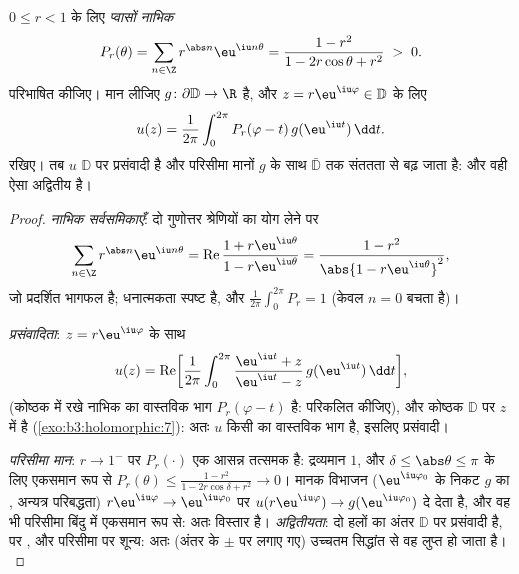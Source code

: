 \begin{theorem}[प्वासों सूत्र; चक्र पर दिरिक्ले
समस्या]\label{thm:b3:conformal:poisson}
$0 \leq r < 1$ के लिए \emph{प्वासों नाभिक}
\[
P_r(\theta) = \sum_{n\in\Z}r^{\abs n}\eu^{\iu n\theta}
= \frac{1 - r^2}{1 - 2r\cos\theta + r^2} \;>\; 0 .
\]
परिभाषित कीजिए। मान लीजिए $g \colon \partial\mathbb D \to \R$  है, और $z = r\eu^{\iu\varphi} \in \mathbb D$ के लिए
\[
u(z) = \frac1{2\pi}\int_0^{2\pi}
P_r(\varphi - t)\,g(\eu^{\iu t})\,\dd t .
\]
रखिए। तब $u$ $\mathbb D$ पर प्रसंवादी है और परिसीमा मानों $g$ के
साथ $\bar{\mathbb D}$ तक संततता से बढ़ जाता है: और वही ऐसा अद्वितीय  है।
\end{theorem}

\begin{proof}
\emph{नाभिक सर्वसमिकाएँ}: दो गुणोत्तर श्रेणियों का योग लेने पर
\[
\sum_{n\in\Z}r^{\abs n}\eu^{\iu n\theta}
= \operatorname{Re}\frac{1 + r\eu^{\iu\theta}}{1 -
r\eu^{\iu\theta}}
= \frac{1 - r^2}{\abs{1 - r\eu^{\iu\theta}}^2},
\]
जो प्रदर्शित भागफल है; धनात्मकता स्पष्ट है, और $\frac1{2\pi}\int_0^{2\pi}P_r = 1$ (केवल $n = 0$
बचता है)।

\emph{प्रसंवादिता}: $z = r\eu^{\iu\varphi}$ के साथ
\[
u(z) = \operatorname{Re}\biggl[\frac1{2\pi}\int_0^{2\pi}
\frac{\eu^{\iu t} + z}{\eu^{\iu t} - z}\,
g(\eu^{\iu t})\,\dd t\biggr],
\]
(कोष्ठक में रखे नाभिक का वास्तविक भाग $P_r(\varphi - t)$ है: परिकलित कीजिए),
और कोष्ठक $\mathbb D$ पर $z$ में  है (\cref{exo:b3:holomorphic:7}): अतः $u$
किसी  का वास्तविक भाग है, इसलिए प्रसंवादी।

\emph{परिसीमा मान}: $r \to 1^-$ पर $P_r(\cdot)$ एक आसन्न तत्समक है: द्रव्यमान
$1$, और $\delta \leq
\abs\theta \leq \pi$ के लिए एकसमान रूप से $P_r(\theta) \leq \frac{1 - r^2}{1 -
2r\cos\delta + r^2} \to 0$। मानक विभाजन ($\eu^{\iu\varphi_0}$ के
निकट $g$ का , अन्यत्र परिबद्धता) $r\eu^{\iu\varphi} \to
\eu^{\iu\varphi_0}$ पर $u(r\eu^{\iu\varphi}) \to
g(\eu^{\iu\varphi_0})$ दे देता
है, और वह भी परिसीमा बिंदु में एकसमान रूप से: अतः विस्तार 
है। \emph{अद्वितीयता}: दो हलों का अंतर $\mathbb D$ पर प्रसंवादी है,
 पर , और परिसीमा पर शून्य: अतः (अंतर के $\pm$ पर लगाए
गए) उच्चतम सिद्धांत से वह लुप्त हो जाता है।
\end{proof}

